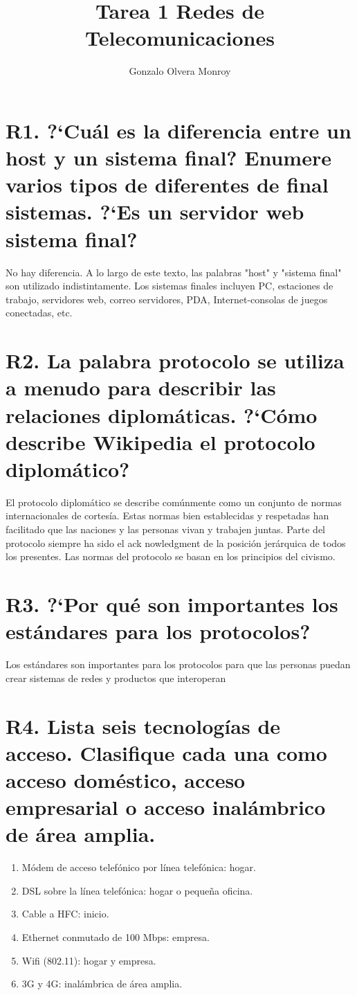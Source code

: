 \documentclass[a4paper, 11pt]{article}
\title{Tarea 1 Redes de Telecomunicaciones}
\author{Gonzalo Olvera Monroy}
\date{}
\theoremstyle{definition} \theoremstyle{remark}
\begin{document}
    \maketitle
    \section{R1. ?`Cu\'al es la diferencia entre un host y un sistema final? Enumere varios tipos de diferentes de final sistemas. ?`Es un servidor web sistema final?}
        No hay diferencia. A lo largo de este texto, las palabras "host" y "sistema final" son utilizado indistintamente. Los sistemas finales incluyen PC, estaciones de trabajo, servidores web, correo servidores, PDA, Internet-consolas de juegos conectadas, etc.

    \section{R2. La palabra protocolo se utiliza a menudo para describir las relaciones diplom\'aticas. ?`C\'omo describe Wikipedia el protocolo diplom\'atico?}
    El protocolo diplom\'atico se describe com\'unmente como un conjunto de normas internacionales de cortes\'ia. Estas normas bien establecidas y respetadas han facilitado que las naciones y las personas vivan y trabajen juntas. Parte del protocolo siempre ha sido el ack nowledgment de la posici\'on jer\'arquica de todos los presentes. Las normas del protocolo se basan en los principios del civismo.

    \section{R3. ?`Por qu\'e son importantes los est\'andares para los protocolos?}
    Los est\'andares son importantes para los protocolos para que las personas puedan crear sistemas de redes y productos que interoperan

    \section{R4. Lista seis tecnolog\'ias de acceso. Clasifique cada una como acceso dom\'estico, acceso empresarial o acceso inal\'ambrico de \'area amplia.}
    \begin{enumerate}
      \item M\'odem de acceso telef\'onico por l\'inea telef\'onica: hogar.
      \item DSL sobre la l\'inea telef\'onica: hogar o peque\~{n}a oficina.
      \item Cable a HFC: inicio.
      \item Ethernet conmutado de 100 Mbps: empresa.
      \item Wifi (802.11): hogar y empresa.
      \item 3G y 4G: inal\'ambrica de \'area amplia.
    \end{enumerate}
\end{document}
